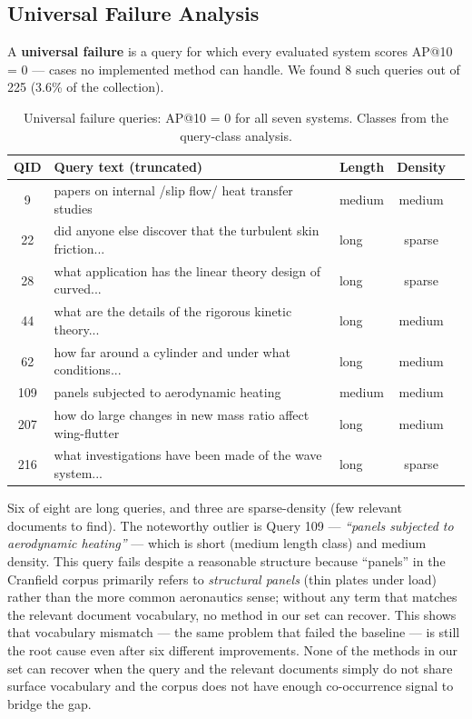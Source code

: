 \documentclass{article}
\begin{document}
\subsection{Universal Failure Analysis}

A \textbf{universal failure} is a query for which every evaluated system scores AP@10 = 0 --- cases no implemented method can handle. We found 8 such queries out of 225 (3.6\% of the collection).

\begin{table}[H]
\centering
\renewcommand{\arraystretch}{1.2}
\begin{tabular}{cllcc}
\toprule
\textbf{QID} & \textbf{Query text (truncated)} & \textbf{Length} & \textbf{Density} \\
\midrule
9   & papers on internal /slip flow/ heat transfer studies        & medium & medium \\
22  & did anyone else discover that the turbulent skin friction... & long   & sparse \\
28  & what application has the linear theory design of curved...  & long   & sparse \\
44  & what are the details of the rigorous kinetic theory...      & long   & medium \\
62  & how far around a cylinder and under what conditions...      & long   & medium \\
109 & panels subjected to aerodynamic heating                    & medium & medium \\
207 & how do large changes in new mass ratio affect wing-flutter  & long   & medium \\
216 & what investigations have been made of the wave system...    & long   & sparse \\
\bottomrule
\end{tabular}
\caption{Universal failure queries: AP@10 = 0 for all seven systems. Classes from the query-class analysis.}
\label{tab:univfail}
\end{table}

Six of eight are long queries, and three are sparse-density (few relevant documents to find). The noteworthy outlier is Query 109 --- \textit{``panels subjected to aerodynamic heating''} --- which is short (medium length class) and medium density. This query fails despite a reasonable structure because ``panels'' in the Cranfield corpus primarily refers to \emph{structural panels} (thin plates under load) rather than the more common aeronautics sense; without any term that matches the relevant document vocabulary, no method in our set can recover. This shows that vocabulary mismatch --- the same problem that failed the baseline --- is still the root cause even after six different improvements. None of the methods in our set can recover when the query and the relevant documents simply do not share surface vocabulary and the corpus does not have enough co-occurrence signal to bridge the gap.
\end{document}
